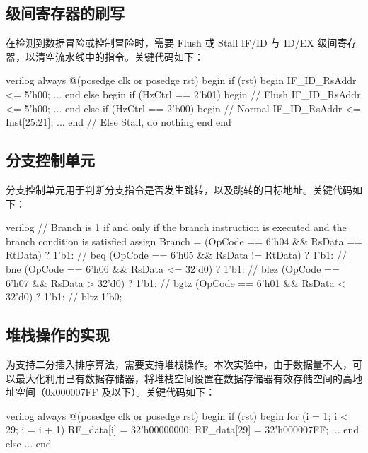 \documentclass[a4paper]{article}  %
\begin{document}
\subsection{级间寄存器的刷写}

在检测到数据冒险或控制冒险时，需要 Flush 或 Stall IF/ID 与 ID/EX 级间寄存器，以清空流水线中的指令。关键代码如下：

\begin{codeblock}{verilog}
always @(posedge clk or posedge rst) begin
    if (rst) begin
        IF_ID_RsAddr <= 5'h00;
        ...
    end
    else begin
        if (HzCtrl == 2'b01) begin  // Flush
            IF_ID_RsAddr <= 5'h00;
            ...
        end
        else if (HzCtrl == 2'b00) begin  // Normal
            IF_ID_RsAddr <= Inst[25:21];
            ...
        end
        // Else Stall, do nothing
    end
end
\end{codeblock}

\subsection{分支控制单元}

分支控制单元用于判断分支指令是否发生跳转，以及跳转的目标地址。关键代码如下：

\begin{codeblock}{verilog}
// Branch is 1 if and only if the branch instruction is executed and the branch condition is satisfied
assign Branch =
            (OpCode == 6'h04 && RsData == RtData) ? 1'b1:  // beq
            (OpCode == 6'h05 && RsData != RtData) ? 1'b1:  // bne
            (OpCode == 6'h06 && RsData <= 32'd0) ? 1'b1:  // blez
            (OpCode == 6'h07 && RsData > 32'd0) ? 1'b1:  // bgtz
            (OpCode == 6'h01 && RsData < 32'd0) ? 1'b1:  // bltz
            1'b0;
\end{codeblock}

\subsection{堆栈操作的实现}

为支持二分插入排序算法，需要支持堆栈操作。本次实验中，由于数据量不大，可以最大化利用已有数据存储器，将堆栈空间设置在数据存储器有效存储空间的高地址空间（0x000007FF 及以下）。关键代码如下：

\begin{codeblock}{verilog}
always @(posedge clk or posedge rst) begin
    if (rst) begin
        for (i = 1; i < 29; i = i + 1)
            RF_data[i] = 32'h00000000;
        RF_data[29] = 32'h000007FF;
        ...
    end
    else ...
end
\end{codeblock}
\end{document}
